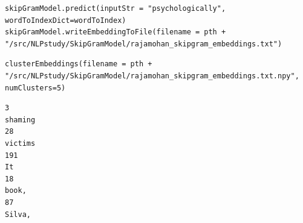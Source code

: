 \documentclass[
]{article}
\begin{document}
\begin{verbatim}
skipGramModel.predict(inputStr = "psychologically", wordToIndexDict=wordToIndex)
skipGramModel.writeEmbeddingToFile(filename = pth + "/src/NLPstudy/SkipGramModel/rajamohan_skipgram_embeddings.txt")
\end{verbatim}

\begin{verbatim}
clusterEmbeddings(filename = pth + "/src/NLPstudy/SkipGramModel/rajamohan_skipgram_embeddings.txt.npy", numClusters=5)
\end{verbatim}

\begin{verbatim}
3
shaming
28
victims
191
It
18
book,
87
Silva,
\end{verbatim}

\begin{verbatim}

\end{verbatim}
\end{document}
